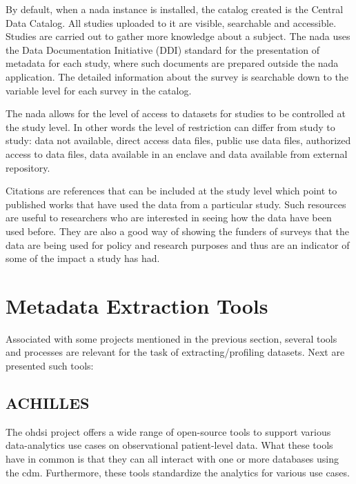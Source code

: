 By default, when a \gls{nada} instance is installed, the catalog created is the Central Data Catalog.
All studies uploaded to it are visible, searchable and accessible.
Studies are carried out to gather more knowledge about a subject.
The \gls{nada} uses the Data Documentation Initiative (DDI) standard for the presentation of metadata for each study, where such documents are prepared outside the \gls{nada} application.
The detailed information about the survey is searchable down to the variable level for each survey in the catalog.

The \gls{nada} allows for the level of access to datasets for studies to be controlled at the study level.
In other words the level of restriction can differ from study to study: data not available, direct access data files, public use data files, authorized access to data files, data available in an enclave and data available from external repository.

Citations are references that can be included at the study level which point to published works that have used the data from a particular study.
Such resources are useful to researchers who are interested in seeing how the data have been used before.
They are also a good way of showing the funders of surveys that the data are being used for policy and research purposes and thus are an indicator of some of the impact a study has had.

\section{Metadata Extraction Tools}

Associated with some projects mentioned in the previous section, several tools and
processes are relevant for the task of extracting/profiling datasets.
Next are presented such tools:

\subsection*{ACHILLES}
The \gls{ohdsi} project offers a wide range of open-source tools\cite{ohdsi-tools} to support various data-analytics use cases on observational patient-level data.
What these tools have in common is that they can all interact with one or more databases using the \gls{cdm}.
Furthermore, these tools standardize the analytics for various use cases.

